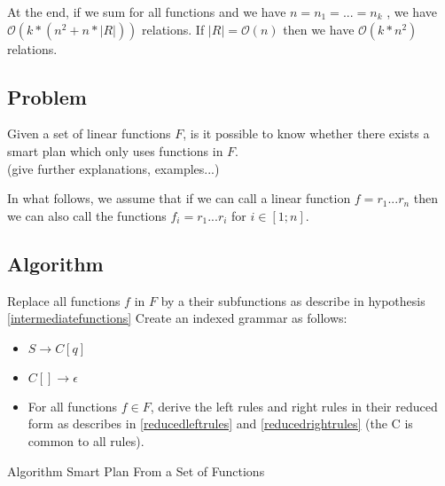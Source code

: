 \documentclass[10pt,a4paper,draft]{article}
\begin{document}
At the end, if we sum for all functions and we have $n = n_1 = ... = n_k$ , we have $\mathcal{O}(k*(n^2 + n * |R|))$ relations. If $|R| = \mathcal{O}(n)$ then we have $\mathcal{O}(k * n^2)$ relations.

\subsection{Problem}

Given a set of linear functions $F$, is it possible to know whether there exists a smart plan which only uses functions in $F$.\\
(give further explanations, examples...)

\begin{hypothesis}
\label{intermediatefunctions}
In what follows, we assume that if we can call a linear function $f = r_1 ... r_n$ then we can also call the functions $f_i = r_1 ... r_i$ for $i \in [1; n]$.

\end{hypothesis}

\subsection{Algorithm}

\begin{algorithm}[H]
 \SetAlgoLined
 Replace all functions $f$ in $F$ by a their subfunctions as describe in hypothesis \ref{intermediatefunctions}\;
 Create an indexed grammar as follows:
 \begin{itemize}
 \item $S \rightarrow C[q]$
 \item $C[] \rightarrow \epsilon$
 \item For all functions $f \in F$, derive the left rules and right rules in their reduced form as describes in \ref{reducedleftrules} and \ref{reducedrightrules} (the C is common to all rules).
 \end{itemize}
 \caption{Algorithm Smart Plan From a Set of Functions}
 \label{functionWBLAlgo}
\end{algorithm}
\end{document}

